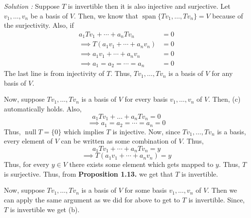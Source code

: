 \vspace{4mm}
\textit{Solution :} Suppose $T$ is invertible then it is also injective and surjective. Let $v_1, \ldots, v_n$ be a basis of $V$.
Then, we know that $\operatorname{span}\{Tv_1,\ldots,Tv_n\} = V$ because of the surjectivity. Also, if 
\begin{align*}
    a_1 Tv_1 + \cdots + a_n Tv_n &= 0 \\
    \implies T(a_1v_1 + \cdots + a_n v_n) &= 0 \\
    \implies a_1 v_1 + \cdots + a_n v_n &= 0 \\
    \implies a_1=a_2=\cdots=a_n&=0
\end{align*}
The last line is from injectivity of $T$. Thus, $Tv_1, \ldots, Tv_n$ is a basis of $V$ for any basis of $V$.

Now, suppose $Tv_1,\ldots,Tv_n$ is a basis of $V$ for every basis $v_1,\ldots,v_n$ of $V$. Then, (c) automatically holds. Also,
\[ a_1 Tv_1 + \ldots + a_n Tv_n = 0 \]
\[ \implies a_1 = a_2 = \cdots = a_n = 0 \]
Thus, $\operatorname{null} T = \{0\}$ which implies $T$ is injective. Now, since $Tv_1,\ldots,Tv_n$ is a basis, every element of $V$ can 
be written as some combination of $V$. Thus,
\[ a_1 Tv_1 + \cdots + a_n Tv_n = y \]
\[ \implies T(a_1 v_1 + \cdots + a_n v_n) = y \]
Thus, for every $y \in V$ there exists some element which gets mapped to $y$. Thus, $T$ is surjective. Thus, from \textbf{Proposition 1.13.}
we get that $T$ is invertible.

Now, suppose $Tv_1,\ldots,Tv_n$ is a basis of $V$ for some basis $v_1, \ldots,v_n$ of $V$. Then we can apply the same argument as we did 
for above to get to $T$ is invertible. Since, $T$ is invertible we get (b).